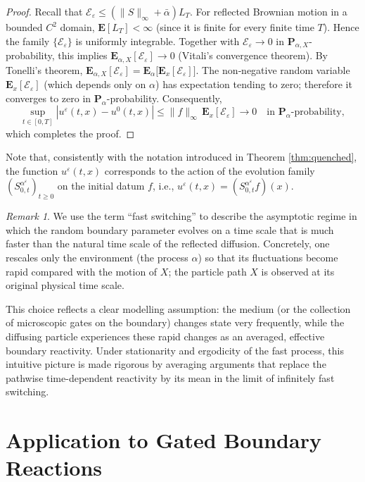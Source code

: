 \documentclass[11pt]{amsart}
\theoremstyle{plain}
\theoremstyle{definition}
\theoremstyle{remark}
\newtheorem{remark}[theorem]{Remark}
\begin{document}
\begin{proof}
	Recall that $\mathcal E_\varepsilon \le (\|S\|_\infty+\bar\alpha)L_T$. For reflected Brownian motion in a bounded $C^2$ domain, $\mathbf E[L_T]<\infty$ (since it is finite for every finite time \(T\)). Hence the family $\{\mathcal E_\varepsilon\}$ is uniformly integrable. Together with $\mathcal E_\varepsilon\to0$ in $\mathbf P_{\alpha,X}$-probability, this implies $\mathbf E_{\alpha,X}[\mathcal E_\varepsilon]\to0$ (Vitali's convergence theorem).
	By Tonelli's theorem,
	$\mathbf E_{\alpha,X}[\mathcal E_\varepsilon] = \mathbf E_\alpha\bigl[\mathbf E_x[\mathcal E_\varepsilon]\bigr]$.
	The non‑negative random variable $\mathbf E_x[\mathcal E_\varepsilon]$ (which depends only on $\alpha$)
	has expectation tending to zero; therefore it converges to zero in $\mathbf P_\alpha$-probability.
	Consequently,
	\[
	\sup_{t\in[0,T]}|u^\varepsilon(t,x)-u^0(t,x)|\le \|f\|_\infty\,\mathbf E_x[\mathcal E_\varepsilon]
	\longrightarrow 0\quad\text{in }\mathbf P_\alpha\text{-probability},
	\]
	which completes the proof.
\end{proof}
	Note that, consistently with the notation introduced in Theorem \ref{thm:quenched}, the function $u^\varepsilon(t,x)$ corresponds to the action of the evolution family $(S_{0,t}^{\alpha^\varepsilon})_{t \ge 0}$ on the initial datum $f$, i.e., $u^\varepsilon(t,x) = (S_{0,t}^{\alpha^\varepsilon} f)(x)$.
	
	\begin{remark}
		We use the term ``fast switching'' to describe the asymptotic regime in which the random boundary parameter evolves on a time scale that is much faster than the natural time scale of the reflected diffusion. Concretely, one rescales only the environment (the process \(\alpha\)) so that its fluctuations become rapid compared with the motion of \(X\); the particle path \(X\) is observed at its original physical time scale. 
		
		This choice reflects a clear modelling assumption: the medium (or the collection of microscopic gates on the boundary) changes state very frequently, while the diffusing particle experiences these rapid changes as an averaged, effective boundary reactivity. Under stationarity and ergodicity of the fast process, this intuitive picture is made rigorous by averaging arguments that replace the pathwise time-dependent reactivity by its mean in the limit of infinitely fast switching.
	\end{remark}
	
	
	
\section{Application to Gated Boundary Reactions}
\end{document}

